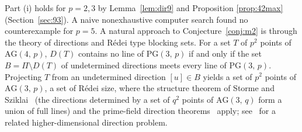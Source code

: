 \documentclass[12pt]{article}
\theoremstyle{definition}
\numberwithin{equation}{section}
\newcommand{\PG}[2]{\mathrm{PG}(#1,\,#2)}
\newcommand{\AG}[2]{\mathrm{AG}(#1,\,#2)}
\begin{document}
Part (i) holds for $p=2,3$ by Lemma~\ref{lem:dir9} and Proposition \ref{prop:42max} (Section~\ref{sec:93}).  A naive nonexhaustive computer search found no counterexample for $p=5$.  A natural approach to  Conjecture~\ref{conj:m2} is through the theory of directions and R\'edei type blocking sets.  For a set $T$ of $p^2$ points of $\AG4p$, $D(T)$ contains no line of $\PG{3}{p}$ if and only if the set $B=\Pi\setminus D(T)$ of undetermined directions meets every line of $\PG{3}{p}$.  Projecting $T$ from an undetermined direction $[u]\in B$ yields a set of $p^{2}$ points of $\AG{3}{p}$, a set of R\'edei size, where the structure theorem of Storme and Sziklai~\cite{MR1869411} (the directions determined by a set of $q^{2}$ points of $\AG{3}{q}$ form a union of full lines) and the prime-field direction theorems~\cite{MR1682973,MR2019280} apply; see~\cite{SzT12} for a related higher-dimensional direction problem.
\end{document}
